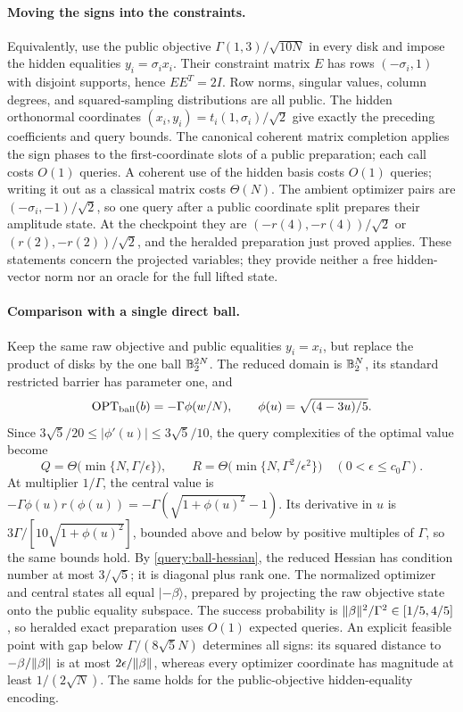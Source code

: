 \paragraph{Moving the signs into the constraints.}
Equivalently, use the public objective
$\Gamma(1,3)/\sqrt{10N}$ in every disk and impose the hidden equalities
$y_i=\sigma_i x_i$. Their constraint matrix $E$ has rows $(-\sigma_i,1)$
with disjoint supports, hence $EE^T=2I$. Row norms, singular values,
column degrees, and squared-sampling distributions are all public. The
hidden orthonormal coordinates $(x_i,y_i)=t_i(1,\sigma_i)/\sqrt2$ give
exactly the preceding coefficients and query bounds. The canonical coherent
matrix completion applies the sign phases to the first-coordinate slots
of a public preparation; each call costs $O(1)$ queries.
A coherent use of the hidden basis costs $O(1)$ queries; writing it out
as a classical matrix costs $\Theta(N)$.
The ambient optimizer pairs are $(-\sigma_i,-1)/\sqrt2$, so one query
after a public coordinate split prepares their amplitude state. At the checkpoint they are $(-r(4),-r(4))/\sqrt2$ or
$(r(2),-r(2))/\sqrt2$, and the heralded preparation just proved applies.
These statements concern the projected variables; they provide neither
a free hidden-vector norm nor an oracle for the full lifted state.

\paragraph{Comparison with a single direct ball.}
Keep the same raw objective and public equalities $y_i=x_i$, but replace
the product of disks by the one ball $\mathbb B_2^{2N}$. The reduced domain is
$\mathbb B_2^N$, its standard restricted barrier has parameter one, and
\[
 \operatorname{OPT}_{\rm ball}(b)=-\Gamma\phi(w/N),\qquad
 \phi(u)=\sqrt{(4-3u)/5}.
\]
Since $3\sqrt5/20\leq|\phi'(u)|\leq3\sqrt5/10$, the query complexities
of the optimal value become
\begin{equation}\label{query:direct-precision}
 Q=\Theta\bigl(\min\{N,\Gamma/\epsilon\}\bigr),\qquad
 R=\Theta\bigl(\min\{N,\Gamma^2/\epsilon^2\}\bigr)
 \quad(0<\epsilon\leq c_0\Gamma).
\end{equation}
At multiplier $1/\Gamma$, the central value is
$-\Gamma\phi(u)r(\phi(u))=-\Gamma(\sqrt{1+\phi(u)^2}-1)$.
Its derivative in $u$ is $3\Gamma/[10\sqrt{1+\phi(u)^2}]$, bounded
above and below by positive multiples of $\Gamma$, so the same bounds hold.
By \eqref{query:ball-hessian}, the reduced Hessian has condition number
at most $3/\sqrt5$; it is diagonal plus rank one. The
normalized optimizer and central states all equal $|-\beta\rangle$,
prepared by projecting the raw objective state
onto the public equality subspace. The success probability is
$\lVert \beta\rVert^2/\Gamma^2\in[1/5,4/5]$, so heralded exact preparation uses
$O(1)$ expected queries. An explicit feasible point with gap
below $\Gamma/(8\sqrt5N)$ determines all signs: its squared distance to
$-\beta/\lVert \beta\rVert$ is at most $2\epsilon/\lVert \beta\rVert$, whereas every
optimizer coordinate has magnitude at least $1/(2\sqrt N)$.
The same holds for the public-objective hidden-equality encoding.


